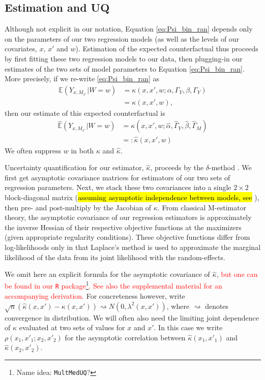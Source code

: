 \documentclass{article}
\newcommand{\bE}{\mathbb{E}}
\begin{document}
\subsection{Estimation and UQ}
\label{sec:CF_UQ}

Although not explicit in our notation, Equation \eqref{eq:Psi_bin_ran} depends only on the parameters of our two regression models (as well as the levels of our covariates, $x$, $x'$ and $w$). Estimation of the expected counterfactual thus proceeds by first fitting these two regression models to our data, then plugging-in our estimates of the two sets of model parameters to Equation \eqref{eq:Psi_bin_ran}. More precisely, if we re-write \eqref{eq:Psi_bin_ran} as
%
\begin{align}
    \bE (Y_{x, M_{x'}} | W=w) &= \kappa(x, x', w; \alpha, \Gamma_Y, \beta, \Gamma_Y) \label{eq:kappa}\\
    &= \kappa(x, x', w), 
\end{align}
%
then our estimate of this expected counterfactual is
\begin{align}
    \hat{\bE} (Y_{x, M_{x'}} | W=w) &= \kappa(x, x', w; \hat{\alpha}, \hat{\Gamma}_Y, \hat{\beta}, \hat{\Gamma}_M) \label{eq:kappa_hat}\\
    &=: \hat{\kappa}(x, x', w)
\end{align}
%
We often suppress $w$ in both $\kappa$ and $\hat{\kappa}$. 

Uncertainty quantification for our estimator, $\hat{\kappa}$, proceeds by the $\delta$-method \citep[see, e.g.,][]{vdV98}. We first get asymptotic covariance matrices for estimators of our two sets of regression parameters. Next, we stack these two covariances into a single $2\times 2$ block-diagonal matrix (\hl{assuming asymptotic independence between models, see} \citealp{Bau06}), then pre- and post-multiply by the Jacobian of $\kappa$. From classical M-estimator theory, the asymptotic covariance of our regression estimators is approximately the inverse Hessian of their respective objective functions at the maximizers (given appropriate regularity conditions). These objective functions differ from log-likelihoods only in that Laplace's method is used to approximate the marginal likelihood of the data from its joint likelihood with the random-effects.

We omit here an explicit formula for the asymptotic covariance of $\hat{\kappa}$, \textcolor{red}{but one can be found in our \texttt{R} package\footnote{Name idea: \texttt{MultMedUQ}?}. See also the supplemental material for an accompanying derivation.} For concreteness however, write $\sqrt{n} (\hat{\kappa}(x, x') - \kappa(x, x')) \rightsquigarrow N(0, \lambda^2(x, x'))$, where $\rightsquigarrow$ denotes convergence in distribution. We will often also need the limiting joint dependence of $\kappa$ evaluated at two sets of values for $x$ and $x'$. In this case we write $\rho(x_1, x'_1; x_2, x'_2)$ for the asymptotic correlation between $\hat{\kappa}(x_1, x'_1)$ and $\hat{\kappa}(x_2, x'_2)$.
\end{document}

